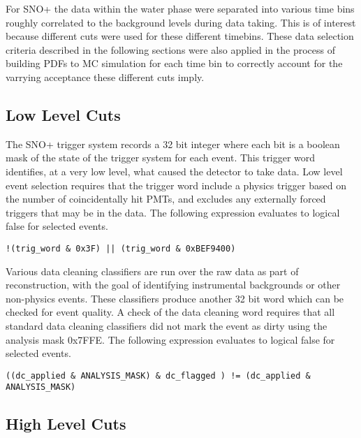 For SNO+ the data within the water phase were separated into various time bins roughly correlated to the background levels during data taking.
This is of interest because different cuts were used for these different timebins.
These data selection criteria described in the following sections were also applied in the process of building PDFs to MC simulation for each time bin to correctly account for the varrying acceptance these different cuts imply.

\subsection{Low Level Cuts}

The SNO+ trigger system records a 32 bit integer where each bit is a boolean mask of the state of the trigger system for each event.
This trigger word identifies, at a very low level, what caused the detector to take data.
Low level event selection requires that the trigger word include a physics trigger based on the number of coincidentally hit PMTs, and excludes any externally forced triggers that may be in the data.
The following expression evaluates to logical false for selected events.

\begin{verbatim}
!(trig_word & 0x3F) || (trig_word & 0xBEF9400)
\end{verbatim}

Various data cleaning classifiers are run over the raw data as part of reconstruction, with the goal of identifying instrumental backgrounds or other non-physics events.
These classifiers produce another 32 bit word which can be checked for event quality.
A check of the data cleaning word requires that all standard data cleaning classifiers did not mark the event as dirty using the analysis mask 0x7FFE.
The following expression evaluates to logical false for selected events.

\begin{verbatim}
((dc_applied & ANALYSIS_MASK) & dc_flagged ) != (dc_applied & ANALYSIS_MASK)
\end{verbatim}

\subsection{High Level Cuts}

